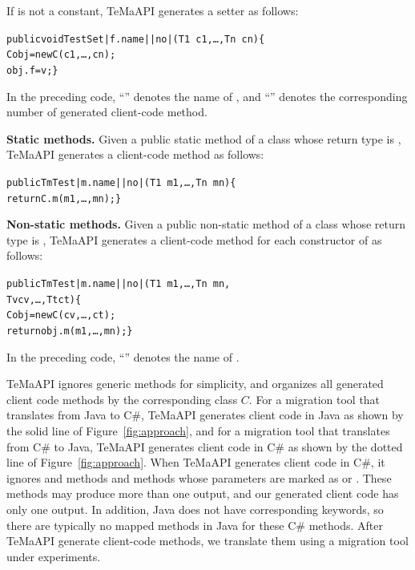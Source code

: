 If  is not a constant, TeMaAPI generates a setter as follows:
\begin{CodeOut}%
\begin{alltt}
 public void TestSet|f.name||no|(T1\ c1,\ldots, Tn\ cn)\{
   C obj = new C(c1,\ldots, cn);
   obj.f = v; \}
\end{alltt}
\end{CodeOut}

In the preceding code, ``'' denotes the name of , and ``'' denotes the corresponding number of generated client-code method.

\textbf{Static methods.} Given a public static method  of a class  whose return type is , TeMaAPI generates a client-code method as follows:
\begin{CodeOut}%
\begin{alltt}
 public Tm Test|m.name||no|(T1\ m1,\ldots, Tn\ mn)\{
   return C.m(m1,\ldots, mn); \}
\end{alltt}
\end{CodeOut}

\textbf{Non-static methods.} Given a public non-static method  of a class  whose return type is , TeMaAPI generates a client-code method for each constructor  of  as follows:
\begin{CodeOut}%
\begin{alltt}
 public Tm Test|m.name||no|(T1\ m1,\ldots, Tn\ mn,
                            Tv cv, \ldots, Tt ct)\{
   C obj = new C(cv,\ldots, ct);
   return obj.m(m1,\ldots, mn); \}
\end{alltt}
\end{CodeOut}

In the preceding code, ``'' denotes the name of .

TeMaAPI ignores generic methods for simplicity, and organizes all generated client code methods by the corresponding class $C$. For a migration tool that translates from Java to C\#, TeMaAPI generates client code in Java as shown by the solid line of Figure~\ref{fig:approach}, and for a migration tool that translates from C\# to Java, TeMaAPI generates client code in C\# as shown by the dotted line of Figure~\ref{fig:approach}. When TeMaAPI generates client code in C\#, it ignores  and  methods and methods whose parameters are marked as  or . These methods may produce more than one output, and our generated client code has only one output. In addition, Java does not have corresponding keywords, so there are typically no mapped methods in Java for these C\# methods. After TeMaAPI generate client-code methods, we translate them using a migration tool under experiments.


